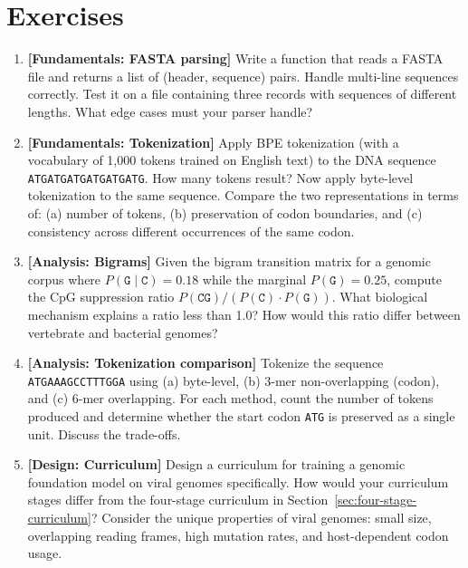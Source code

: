 \section{Exercises}
\label{sec:ch13-exercises}

\begin{enumerate}[label=\textbf{13.\arabic*.}, leftmargin=2.5em]

\item \textbf{[Fundamentals: FASTA parsing]} Write a function that reads a FASTA file and returns a list of (header, sequence) pairs. Handle multi-line sequences correctly. Test it on a file containing three records with sequences of different lengths. What edge cases must your parser handle?

\item \textbf{[Fundamentals: Tokenization]} Apply BPE tokenization (with a vocabulary of 1,000 tokens trained on English text) to the DNA sequence \texttt{ATGATGATGATGATGATG}. How many tokens result? Now apply byte-level tokenization to the same sequence. Compare the two representations in terms of: (a) number of tokens, (b) preservation of codon boundaries, and (c) consistency across different occurrences of the same codon.

\item \textbf{[Analysis: Bigrams]} Given the bigram transition matrix for a genomic corpus where $P(\texttt{G} \mid \texttt{C}) = 0.18$ while the marginal $P(\texttt{G}) = 0.25$, compute the CpG suppression ratio $P(\texttt{CG}) / (P(\texttt{C}) \cdot P(\texttt{G}))$. What biological mechanism explains a ratio less than 1.0? How would this ratio differ between vertebrate and bacterial genomes?

\item \textbf{[Analysis: Tokenization comparison]} Tokenize the sequence \texttt{ATGAAAGCCTTTGGA} using (a) byte-level, (b) 3-mer non-overlapping (codon), and (c) 6-mer overlapping. For each method, count the number of tokens produced and determine whether the start codon \texttt{ATG} is preserved as a single unit. Discuss the trade-offs.

\item \textbf{[Design: Curriculum]} Design a curriculum for training a genomic foundation model on viral genomes specifically. How would your curriculum stages differ from the four-stage curriculum in Section~\ref{sec:four-stage-curriculum}? Consider the unique properties of viral genomes: small size, overlapping reading frames, high mutation rates, and host-dependent codon usage.


\end{enumerate}

